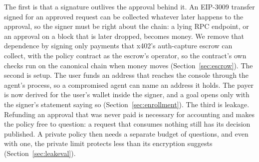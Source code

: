 The first is that a signature outlives the approval behind it. An EIP-3009 transfer signed for an
approved request can be collected whatever later happens to the approval, so the signer must be right
about the chain: a lying RPC endpoint, or an approval on a block that is later dropped, becomes money.
We remove that dependence by signing only payments that x402's auth-capture escrow can collect, with
the policy contract as the escrow's operator, so the contract's own checks run on the canonical chain
when money moves (Section~\ref{sec:escrow}). The second is setup. The user funds an address that
reaches the console through the agent's process, so a compromised agent can name an address it holds.
The payer is now derived for the user's wallet inside the signer, and a goal opens only with the
signer's statement saying so (Section~\ref{sec:enrollment}). The third is leakage. Refunding an approval
that was never paid is necessary for accounting and makes the policy free to question: a request that
consumes nothing still has its decision published. A private policy then needs a separate budget of
questions, and even with one, the private limit protects less than its encryption suggests
(Section~\ref{sec:leakeval}).


